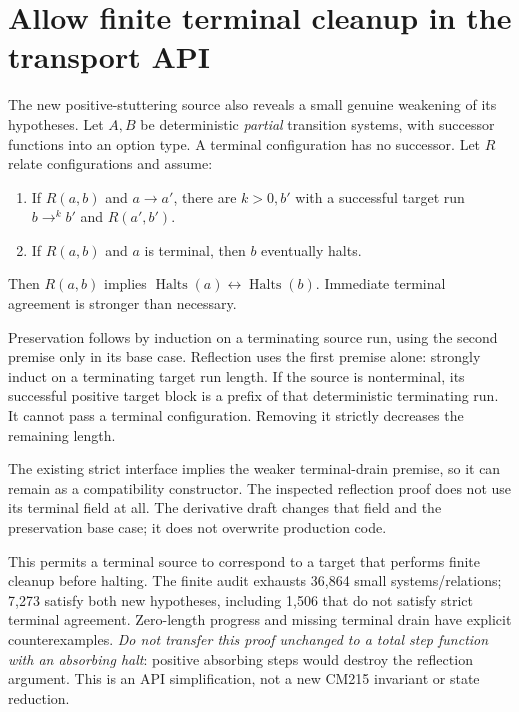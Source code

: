 \documentclass[11pt]{article}
\newcommand{\Halts}{\operatorname{Halts}}
\begin{document}
\section{Allow finite terminal cleanup in the transport API}
The new positive-stuttering source also reveals a small genuine weakening of its hypotheses. Let $A,B$ be deterministic \emph{partial} transition systems, with successor functions into an option type. A terminal configuration has no successor. Let $R$ relate configurations and assume:
\begin{enumerate}
\item If $R(a,b)$ and $a\to a'$, there are $k>0,b'$ with a successful target run $b\to^k b'$ and $R(a',b')$.
\item If $R(a,b)$ and $a$ is terminal, then $b$ eventually halts.
\end{enumerate}
Then $R(a,b)$ implies $\Halts(a)\leftrightarrow\Halts(b)$. Immediate terminal agreement is stronger than necessary.

Preservation follows by induction on a terminating source run, using the second premise only in its base case. Reflection uses the first premise alone: strongly induct on a terminating target run length. If the source is nonterminal, its successful positive target block is a prefix of that deterministic terminating run. It cannot pass a terminal configuration. Removing it strictly decreases the remaining length.

The existing strict interface implies the weaker terminal-drain premise, so it can remain as a compatibility constructor. The inspected reflection proof does not use its terminal field at all. The derivative draft changes that field and the preservation base case; it does not overwrite production code.

This permits a terminal source to correspond to a target that performs finite cleanup before halting. The finite audit exhausts 36,864 small systems/relations; 7,273 satisfy both new hypotheses, including 1,506 that do not satisfy strict terminal agreement. Zero-length progress and missing terminal drain have explicit counterexamples. \emph{Do not transfer this proof unchanged to a total step function with an absorbing halt}: positive absorbing steps would destroy the reflection argument. This is an API simplification, not a new CM215 invariant or state reduction.
\end{document}
